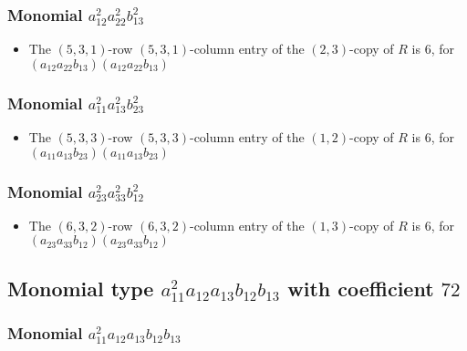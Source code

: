\documentclass{article}
\begin{document}
\subsubsection{Monomial $ a_{12}^{2} a_{22}^{2} b_{13}^{2} $}

\begin{itemize}
\item The $(5, 3, 1)$-row $(5, 3, 1)$-column entry of the $ \left(2, 3\right) $-copy of $R$ is $ 6 $, for $( a_{12} a_{22} b_{13} )( a_{12} a_{22} b_{13} )$ 
\end{itemize}
\subsubsection{Monomial $ a_{11}^{2} a_{13}^{2} b_{23}^{2} $}

\begin{itemize}
\item The $(5, 3, 3)$-row $(5, 3, 3)$-column entry of the $ \left(1, 2\right) $-copy of $R$ is $ 6 $, for $( a_{11} a_{13} b_{23} )( a_{11} a_{13} b_{23} )$ 
\end{itemize}
\subsubsection{Monomial $ a_{23}^{2} a_{33}^{2} b_{12}^{2} $}

\begin{itemize}
\item The $(6, 3, 2)$-row $(6, 3, 2)$-column entry of the $ \left(1, 3\right) $-copy of $R$ is $ 6 $, for $( a_{23} a_{33} b_{12} )( a_{23} a_{33} b_{12} )$ 
\end{itemize}
\subsection{Monomial type $ a_{11}^{2} a_{12} a_{13} b_{12} b_{13} $ with coefficient $ 72 $}

\subsubsection{Monomial $ a_{11}^{2} a_{12} a_{13} b_{12} b_{13} $}
\end{document}
